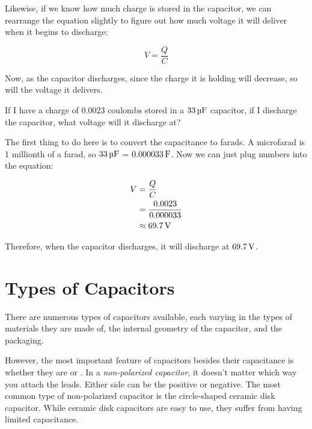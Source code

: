 Likewise, if we know how much charge is stored in the capacitor, we can rearrange the equation slightly to figure out how much voltage it will deliver when it begins to discharge:

\begin{equation}
\label{eqCapacitanceToVoltage}
V = \frac{Q}{C}
\end{equation}

Now, as the capacitor discharges, since the charge it is holding will decrease, so will the voltage it delivers.

\begin{exampleprob}
If I have a charge of $0.0023 \textrm{ coulombs}$ stored in a $33\,\si{\micro\farad}$ capacitor, if I discharge the capacitor, what voltage will it discharge at?

The first thing to do here is to convert the capacitance to farads.  A microfarad is 1 millionth of a farad, so $33\,\si{\micro\farad}$ = $0.000033\,\si{\farad}$.
Now we can just plug numbers into the equation:

\begin{align*}
V &= \frac{Q}{C} \\
  &= \frac{0.0023}{0.000033} \\
  &\approx 69.7\,\si{\volt}
\end{align*}

Therefore, when the capacitor discharges, it will discharge at $69.7\,\si{\volt}$.

\end{exampleprob}

\section{Types of Capacitors}

There are numerous types of capacitors available, each varying in the types of materials they are made of, the internal geometry of the capacitor, and the packaging.


However, the most important feature of capacitors besides their capacitance is whether they are  or .
In a \emph{non-polarized capacitor}, it doesn't matter which way you attach the leads.
Either side can be the positive or negative.
The most common type of non-polarized capacitor is the circle-shaped ceramic disk capacitor.
While ceramic disk capacitors are easy to use, they suffer from having limited capacitance.

